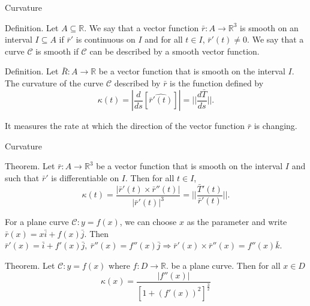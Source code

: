 \documentclass{beamer}
\begin{document}
       \begin{frame}[t]{Curvature}
        \begin{block}
            \par \textcolor{yy}{Definition.} Let $A \subseteq \mathbb{R}$. We say that a vector function $\bar{r}: A \to \mathbb{R}^3$ is \textcolor{yy}{smooth} on an interval $I \subseteq A$ if $\bar{r}'$ is continuous on $I$ and for all $t \in I$, $\bar{r}'(t) \neq 0$. We say that a curve $\mathcal{C}$ is \textcolor{yy}{smooth} if $\mathcal{C}$ can be described by a smooth vector function.
        \end{block}

        \begin{block}
            \par \textcolor{yy}{Definition.} Let $\bar{R}: A \to \mathbb{R}$ be a vector function that is smooth on the interval $I$. The \textcolor{yy}{curvature} of the curve $\mathcal{C}$ described by $\bar{r}$ is the function defined by 
            \begin{equation*}
                \kappa (t) = \left| \dfrac{d}{ds} \left[ \widehat{ \bar{r}'(t) } \right] \right| = ||\frac{d\bar{T}}{ds}||.
            \end{equation*}
            \par It measures the rate at which the direction of the vector function $\bar{r}$ is changing.
            \end{block}
    \end{frame}

    \begin{frame}[t]{Curvature}
        \begin{block}
            \par \textcolor{yy}{Theorem.} Let $\bar{r}: A \to \mathbb{R}^3$ be a vector function that is smooth on the interval $I$ and such that $\bar{r}'$ is differentiable on $I$. Then for all $t \in I$, 
            \begin{equation*}
                \kappa (t) = \dfrac{\left| \bar{r}'(t) \times \bar{r}''(t)\right|}{\left| \bar{r}'(t) \right|^3} = ||\frac{\bar{T}'(t)}{\bar{r}'(t)}||.
            \end{equation*}
        \end{block}
        \par For a plane curve $\mathcal{C}: y = f(x)$, we can choose $x$ as the parameter and write $\bar{r}(x) = x \bar{i} + f(x) \bar{j}$. Then $\bar{r}'(x) = \bar{i} + f'(x) \bar{j},\ \bar{r}''(x) = f''(x) \bar{j} \Rightarrow \bar{r}'(x) \times \bar{r}''(x) = f''(x) \bar{k}$.
        
        \begin{block}
            \par \textcolor{yy}{Theorem.} Let $\mathcal{C}: y = f(x)$ where $f: D \to \mathbb{R}$. be a plane curve. Then for all $x \in D$
            \begin{equation*}
                \kappa(x) = \dfrac{|f''(x)|}{\left[1 + \left(f'(x)\right)^2\right]^{\frac{3}{2}}}      
            \end{equation*}
        \end{block}
    \end{frame}
    
\end{document}
